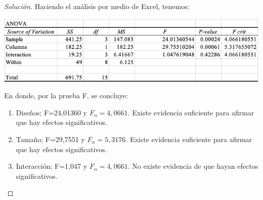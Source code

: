 \documentclass[a4paper,12pt]{article}
\newenvironment{solution}
  {\renewcommand\qedsymbol{$\blacksquare$}\begin{proof}[Solución]}
  {\end{proof}}
\begin{document}
\begin{solution}
Haciendo el análisis por medio de Excel, tenemos: 
\begin{center}
    \includegraphics[scale=0.5]{Images/30-bueno.png}
\end{center}
En donde, por la prueba F, se concluye: 
\begin{enumerate}
    \item Diseños; F=24,01360 y $F_\alpha=4,0661$. Existe evidencia suficiente para afirmar que hay efectos significativos.
    \item Tamaño; F=29,7551 y $F_\alpha=5,3176$. Existe evidencia suficiente para afirmar que hay efectos significativos.
    \item Interacción; F=1,047 y $F_\alpha=4,0661$. No existe evidencia de que hayan efectos significativos.
\end{enumerate}
\end{solution}
\end{document}

